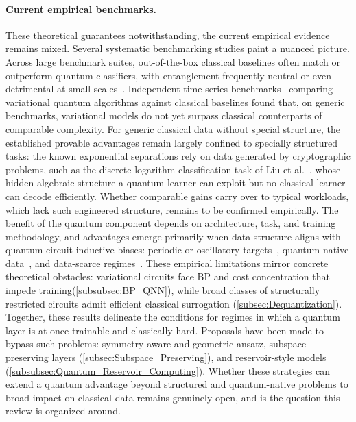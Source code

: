 \documentclass[aps,10pt,groupedaddress,prx,superscriptaddress,twocolumn,balancelastpage, tightenlines]{revtex4-2}
\theoremstyle{plain}  %
\begin{document}
\paragraph{Current empirical benchmarks.}
These theoretical guarantees notwithstanding, the current empirical evidence remains mixed. Several systematic benchmarking studies paint a nuanced picture. Across large benchmark suites, out-of-the-box classical baselines often match or outperform quantum classifiers, with entanglement frequently neutral or even detrimental at small scales~\cite{bowles2024better}. Independent time-series benchmarks~\cite{fellner_quantum_2026} comparing variational quantum algorithms against classical baselines found that, on generic benchmarks, variational models do not yet surpass classical counterparts of comparable complexity. For generic classical data without special structure, the established provable advantages remain largely confined to specially structured tasks: the known exponential separations rely on data generated by cryptographic problems, such as the discrete-logarithm classification task of Liu et al.~\cite{liu2021rigorous}, whose hidden algebraic structure a quantum learner can exploit but no classical learner can decode efficiently. Whether comparable gains carry over to typical workloads, which lack such engineered structure, remains to be confirmed empirically. The benefit of the quantum component depends on architecture, task, and training methodology, and advantages emerge primarily when data structure aligns with quantum circuit inductive
biases: periodic or oscillatory targets~\cite{Schuld_2021_Effect}, quantum-native data~\cite{Huang2022Science}, and data-scarce regimes~\cite{Caro_2022_Generalization}. These empirical limitations mirror concrete theoretical obstacles: variational circuits face \gls{BP} and cost concentration that impede training(\autoref{subsubsec:BP_QNN}), while broad classes of structurally restricted circuits admit efficient classical surrogation (\autoref{subsec:Dequantization}). Together, these results delineate the conditions for regimes in which a quantum layer is at once trainable and classically hard. Proposals have been made to bypass such problems: symmetry-aware and geometric ansatz, subspace-preserving layers (\autoref{subsec:Subspace_Preserving}), and reservoir-style models (\autoref{subsubsec:Quantum_Reservoir_Computing}). Whether these strategies can extend a quantum advantage beyond structured and quantum-native problems to broad impact on classical data remains genuinely open, and is the question this review is organized around.
\end{document}
